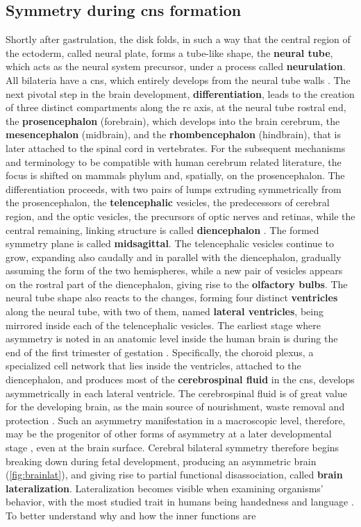 \subsection{Symmetry during \acs{cns} formation}
Shortly after gastrulation, the disk folds, in such a way that the central region of the ectoderm, called neural plate, forms a tube-like shape, the \textbf{neural tube}, which acts as the neural system precursor, under a process called \textbf{neurulation}. All bilateria have a \acf{cns}, which entirely develops from the neural tube walls \cite{F.Bear2016a}. The next pivotal step in the brain development, \textbf{differentiation}, leads to the creation of three distinct compartments along the \ac{rc} axis, at the neural tube rostral end, the \textbf{prosencephalon} (forebrain), which develops into the brain cerebrum, the \textbf{mesencephalon} (midbrain), and the \textbf{rhombencephalon} (hindbrain), that is later attached to the spinal cord in vertebrates. For the subsequent mechanisms and terminology to be compatible with human cerebrum related literature, the focus is shifted on mammals phylum and, spatially, on the prosencephalon. The differentiation proceeds, with two pairs of lumps extruding symmetrically from the prosencephalon, the \textbf{telencephalic} vesicles, the predecessors of cerebral region, and the optic vesicles, the precursors of optic nerves and retinas, while the central remaining, linking structure is called \textbf{diencephalon} \cite{F.Bear2016b}. The formed symmetry plane is called \textbf{midsagittal}. The telencephalic vesicles continue to grow, expanding also caudally and in parallel with the diencephalon, gradually assuming the form of the two hemispheres, while a new pair of vesicles appears on the rostral part of the diencephalon, giving rise to the \textbf{olfactory bulbs}. The neural tube shape also reacts to the changes, forming four distinct \textbf{ventricles} along the neural tube, with two of them, named \textbf{lateral ventricles}, being mirrored inside each of the telencephalic vesicles. The earliest stage where asymmetry is noted in an anatomic level inside the human brain is during the end of the first trimester of gestation \cite{Abu-Rustum2013}. Specifically, the choroid plexus, a specialized cell network that lies inside the ventricles, attached to the diencephalon, and produces most of the \textbf{cerebrospinal fluid} in the \ac{cns},  develops asymmetrically in each lateral ventricle. The cerebrospinal fluid is of great value for the developing brain, as the main source of nourishment, waste removal and protection \cite{Telano2021}. Such an asymmetry manifestation in a macroscopic level, therefore, may be the progenitor of other forms of asymmetry at a later developmental stage \cite{Schmitz2019}, even at the brain surface. Cerebral bilateral symmetry therefore begins breaking down during fetal development, producing an asymmetric brain (\autoref{fig:brainlat}), and giving rise to partial functional disassociation, called \textbf{brain lateralization}. Lateralization becomes visible when examining organisms' behavior, with the most studied trait in humans being handedness and language \cite{Schmitz2019,Corballis2009}. To better understand why and how the inner functions are 